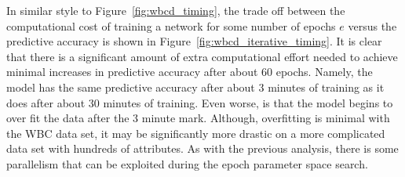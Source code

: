 In similar style to Figure~\ref{fig:wbcd_timing}, the trade off between the computational cost of training a network for some number of epochs \(e\) versus the predictive accuracy is shown in Figure~\ref{fig:wbcd_iterative_timing}.
It is clear that there is a significant amount of extra computational effort needed to achieve minimal increases in predictive accuracy after about 60 epochs.
Namely, the model has the same predictive accuracy after about 3 minutes of training as it does after about 30 minutes of training.
Even worse, is that the model begins to over fit the data after the 3 minute mark.
Although, overfitting is minimal with the WBC data set, it may be significantly more drastic on a more complicated data set with hundreds of attributes.
As with the previous analysis, there is some parallelism that can be exploited during the epoch parameter space search.

